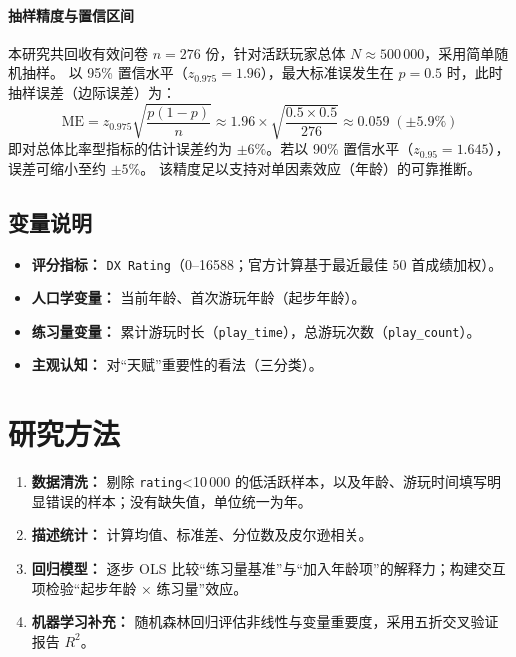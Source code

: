 \documentclass[12pt]{article}
\begin{document}
\paragraph{抽样精度与置信区间}
本研究共回收有效问卷 $n=276$ 份，针对活跃玩家总体 $N\approx500\,000$，采用简单随机抽样。  
以 95\% 置信水平（$z_{0.975}=1.96$），最大标准误发生在 $p=0.5$ 时，此时抽样误差（边际误差）为：
\[
\mathrm{ME}
= z_{0.975} \sqrt{\frac{p(1-p)}{n}}
\approx 1.96 \times \sqrt{\frac{0.5 \times 0.5}{276}}
\approx 0.059 \;(\pm 5.9\%)
\]
即对总体比率型指标的估计误差约为 $\pm6\%$。若以 90\% 置信水平（$z_{0.95}=1.645$），误差可缩小至约 $\pm5\%$。  
该精度足以支持对单因素效应（年龄）的可靠推断。

\subsection{变量说明}

\begin{itemize}
	\item \textbf{评分指标：} \texttt{DX Rating}（0--16588；官方计算基于最近最佳 50 首成绩加权）。
	\item \textbf{人口学变量：} 当前年龄、首次游玩年龄（起步年龄）。
	\item \textbf{练习量变量：} 累计游玩时长（\texttt{play\_time}），总游玩次数（\texttt{play\_count}）。
	\item \textbf{主观认知：} 对“天赋”重要性的看法（三分类）。
\end{itemize}

\section{研究方法}

\begin{enumerate}
	\item \textbf{数据清洗：} 剔除 \texttt{rating}<10\,000 的低活跃样本，以及年龄、游玩时间填写明显错误的样本；没有缺失值，单位统一为年。
	\item \textbf{描述统计：} 计算均值、标准差、分位数及皮尔逊相关。
	\item \textbf{回归模型：} 逐步 OLS 比较“练习量基准”与“加入年龄项”的解释力；构建交互项检验“起步年龄 × 练习量”效应。
	\item \textbf{机器学习补充：} 随机森林回归评估非线性与变量重要度，采用五折交叉验证报告 $R^2$。
\end{enumerate}
\end{document}
